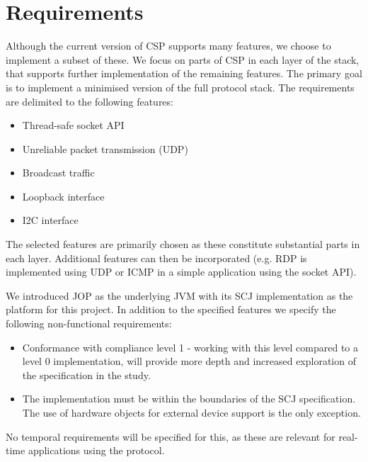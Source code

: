 \section{Requirements}
Although the current version of CSP supports many features, we choose to implement a subset of these. We focus on parts of CSP in each layer of the stack, that supports further implementation of the remaining features. The primary goal is to implement a minimised version of the full protocol stack. The requirements are delimited to the following features:

\begin{itemize}
	\item Thread-safe socket API
	\item Unreliable packet transmission (UDP)
	\item Broadcast traffic
	\item Loopback interface
	\item I2C interface
\end{itemize}

The selected features are primarily chosen as these constitute substantial parts in each layer. Additional features can then be incorporated (e.g. RDP is implemented using UDP or ICMP in a simple application using the socket API). 

We introduced JOP as the underlying JVM with its SCJ implementation as the platform for this project. In addition to the specified features we specify the following non-functional requirements:

\begin{itemize}
	\item Conformance with compliance level 1 - working with this level compared to a level 0 implementation, will provide more depth and increased exploration of the specification in the study.
	\item The implementation must be within the boundaries of the SCJ specification. The use of hardware objects for external device support is the only exception.
\end{itemize}

No temporal requirements will be specified for this, as these are relevant for real-time applications using the protocol.